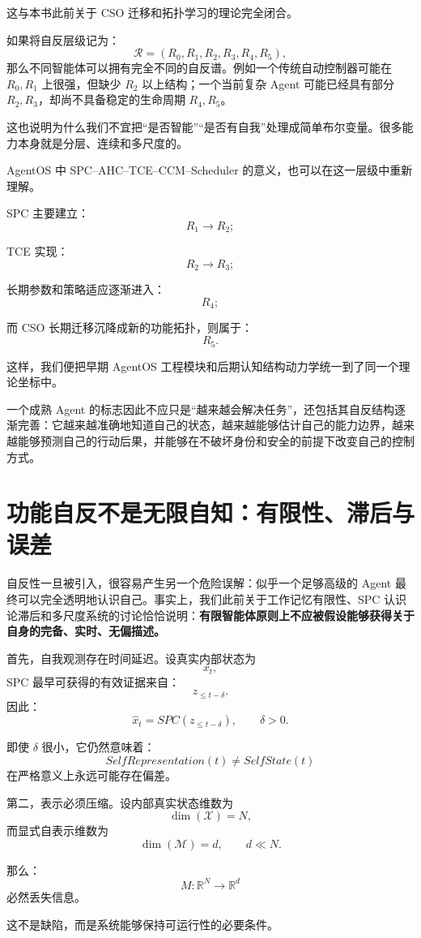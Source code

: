 这与本书此前关于 CSO 迁移和拓扑学习的理论完全闭合。

如果将自反层级记为：
\[
\mathcal R=
(R_0,R_1,R_2,R_3,R_4,R_5),
\]
那么不同智能体可以拥有完全不同的自反谱。例如一个传统自动控制器可能在 \(R_0,R_1\) 上很强，但缺少 \(R_2\) 以上结构；一个当前复杂 Agent 可能已经具有部分 \(R_2,R_3\)，却尚不具备稳定的生命周期 \(R_4,R_5\)。

这也说明为什么我们不宜把“是否智能”“是否有自我”处理成简单布尔变量。很多能力本身就是分层、连续和多尺度的。

AgentOS 中 SPC--AHC--TCE--CCM--Scheduler 的意义，也可以在这一层级中重新理解。

SPC 主要建立：
\[
R_1\rightarrow R_2;
\]

TCE 实现：
\[
R_2\rightarrow R_3;
\]

长期参数和策略适应逐渐进入：
\[
R_4;
\]

而 CSO 长期迁移沉降成新的功能拓扑，则属于：
\[
R_5.
\]

这样，我们便把早期 AgentOS 工程模块和后期认知结构动力学统一到了同一个理论坐标中。

一个成熟 Agent 的标志因此不应只是“越来越会解决任务”，还包括其自反结构逐渐完善：它越来越准确地知道自己的状态，越来越能够估计自己的能力边界，越来越能够预测自己的行动后果，并能够在不破坏身份和安全的前提下改变自己的控制方式。

\section{功能自反不是无限自知：有限性、滞后与误差}

自反性一旦被引入，很容易产生另一个危险误解：似乎一个足够高级的 Agent 最终可以完全透明地认识自己。事实上，我们此前关于工作记忆有限性、SPC 认识论滞后和多尺度系统的讨论恰恰说明：\textbf{有限智能体原则上不应被假设能够获得关于自身的完备、实时、无偏描述。}

首先，自我观测存在时间延迟。设真实内部状态为
\[
x_t,
\]
SPC 最早可获得的有效证据来自：
\[
z_{\leq t-\delta}.
\]
因此：
\[
\hat x_t
=
SPC(z_{\leq t-\delta}),
\qquad
\delta>0.
\]

即使 \(\delta\) 很小，它仍然意味着：
\[
SelfRepresentation(t)
\neq
SelfState(t)
\]
在严格意义上永远可能存在偏差。

第二，表示必须压缩。设内部真实状态维数为
\[
\dim(\mathcal X)=N,
\]
而显式自表示维数为
\[
\dim(\mathcal M)=d,
\qquad
d\ll N.
\]

那么：
\[
M:\mathbb R^N\rightarrow\mathbb R^d
\]
必然丢失信息。

这不是缺陷，而是系统能够保持可运行性的必要条件。

